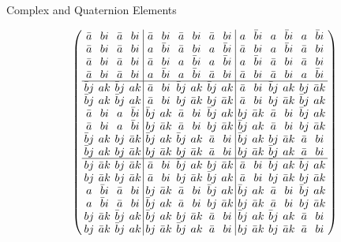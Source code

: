 \documentclass{beamer}
\begin{document}
\begin{frame}{Complex and Quaternion Elements}

  \[
    \arraycolsep=2.0pt\def\arraystretch{0.75}
    \left(
      \begin{array}{cccc|cccccc|cccccc}
        \bar{a}&bi&\bar{a}&bi&\bar{a}&bi&\bar{a}&bi&\bar{a}&bi& a&\bar{b}i& a&\bar{b}i& a&\bar{b}i\\
        \bar{a}&bi&\bar{a}&bi& a&\bar{b}i&\bar{a}&bi& a&\bar{b}i&\bar{a}&bi& a&\bar{b}i&\bar{a}&bi\\
        \bar{a}&bi&\bar{a}&bi&\bar{a}&bi& a&\bar{b}i& a&\bar{b}i& a&\bar{b}i&\bar{a}&bi&\bar{a}&bi\\
        \bar{a}&bi&\bar{a}&bi& a&\bar{b}i& a&\bar{b}i&\bar{a}&bi&\bar{a}&bi&\bar{a}&bi& a&\bar{b}i\\\hline
        \bar{b}j&ak&\bar{b}j&ak&\bar{a}&bi&\bar{b}j&ak&\bar{b}j&ak&\bar{a}&bi&\bar{b}j&ak&bj&\bar{a}k\\
        \bar{b}j&ak&\bar{b}j&ak&\bar{a}&bi&bj&\bar{a}k&bj&\bar{a}k&\bar{a}&bi&bj&\bar{a}k&\bar{b}j&ak\\
        \bar{a}&bi& a&\bar{b}i&\bar{b}j&ak&\bar{a}&bi&\bar{b}j&ak&bj&\bar{a}k&\bar{a}&bi&\bar{b}j&ak\\
        \bar{a}&bi& a&\bar{b}i&bj&\bar{a}k&\bar{a}&bi&bj&\bar{a}k&\bar{b}j&ak&\bar{a}&bi&bj&\bar{a}k\\
        \bar{b}j&ak&bj&\bar{a}k&\bar{b}j&ak&\bar{b}j&ak&\bar{a}&bi&\bar{b}j&ak&bj&\bar{a}k&\bar{a}&bi\\
        \bar{b}j&ak&bj&\bar{a}k&bj&\bar{a}k&bj&\bar{a}k&\bar{a}&bi&bj&\bar{a}k&\bar{b}j&ak&\bar{a}&bi\\\hline
        bj&\bar{a}k&bj&\bar{a}k&\bar{a}&bi&\bar{b}j&ak&bj&\bar{a}k&\bar{a}&bi&\bar{b}j&ak&\bar{b}j&ak\\
        bj&\bar{a}k&bj&\bar{a}k&\bar{a}&bi&bj&\bar{a}k&\bar{b}j&ak&\bar{a}&bi&bj&\bar{a}k&bj&\bar{a}k\\
        a&\bar{b}i&\bar{a}&bi&bj&\bar{a}k&\bar{a}&bi&\bar{b}j&ak&\bar{b}j&ak&\bar{a}&bi&\bar{b}j&ak\\
        a&\bar{b}i&\bar{a}&bi&\bar{b}j&ak&\bar{a}&bi&bj&\bar{a}k&bj&\bar{a}k&\bar{a}&bi&bj&\bar{a}k\\
        bj&\bar{a}k&\bar{b}j&ak&\bar{b}j&ak&bj&\bar{a}k&\bar{a}&bi&\bar{b}j&ak&\bar{b}j&ak&\bar{a}&bi\\
        bj&\bar{a}k&\bar{b}j&ak&bj&\bar{a}k&\bar{b}j&ak&\bar{a}&bi&bj&\bar{a}k&bj&\bar{a}k&\bar{a}&bi\\
      \end{array}
    \right)
  \]

\end{frame}
\end{document}
